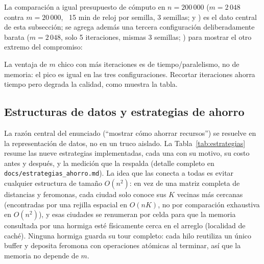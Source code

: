 \documentclass[12pt,a4paper]{article}
\begin{document}
La comparación a igual presupuesto de cómputo en $n=200\,000$ ($m=2\,048$
contra $m=20\,000$, ~15 min de reloj por semilla, 3 semillas;
\texttt{} y
\texttt{}) es el dato
central de esta subsección; se agrega además una tercera configuración
deliberadamente barata ($m=2\,048$, solo 5 iteraciones, mismas 3 semillas;
\texttt{}) para mostrar
el otro extremo del compromiso:

\begin{table}[H]\centering
\caption{Tres configuraciones en n=200\,000: dos a igual presupuesto de tiempo (m=20\,000, 10 iteraciones; m=2\,048, 108 iteraciones) y una configuración barata de contraste (m=2\,048, 5 iteraciones).}
\label{tab:igual_presupuesto}
\footnotesize
{}
\end{table}

La ventaja de $m$ chico con más iteraciones es de tiempo/paralelismo, no
de memoria: el pico es igual en las tres configuraciones. Recortar
iteraciones ahorra tiempo pero degrada la calidad, como muestra la tabla.

\subsection{Estructuras de datos y estrategias de ahorro}
\label{sec:estrategias}
La razón central del enunciado (``mostrar cómo ahorrar recursos'') se resuelve
en la representación de datos, no en un truco aislado. La Tabla~\ref{tab:estrategias}
resume las nueve estrategias implementadas, cada una con su motivo, su costo
antes y después, y la medición que la respalda (detalle completo en
\texttt{docs/estrategias\_ahorro.md}). La idea que las conecta a todas es
evitar cualquier estructura de tamaño $O(n^2)$: en vez de una matriz
completa de distancias y feromonas, cada ciudad solo conoce sus $K$ vecinas
más cercanas (encontradas por una rejilla espacial en $O(nK)$, no por
comparación exhaustiva en $O(n^2)$), y esas ciudades se renumeran por celda
para que la memoria consultada por una hormiga esté físicamente cerca en el
arreglo (localidad de caché). Ninguna hormiga guarda su tour completo: cada
hilo reutiliza un único buffer y deposita feromona con operaciones atómicas
al terminar, así que la memoria no depende de $m$.
\end{document}
